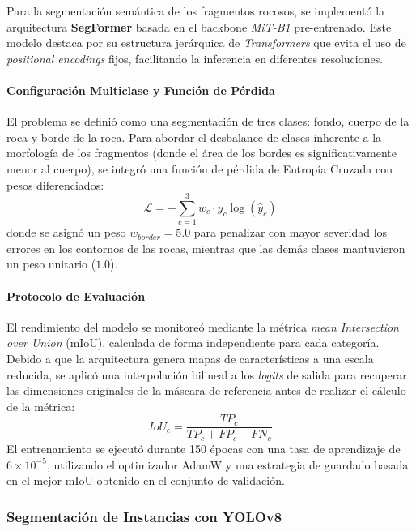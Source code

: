 Para la segmentación semántica de los fragmentos rocosos, se implementó la arquitectura \textbf{SegFormer} basada en el backbone \textit{MiT-B1} pre-entrenado. Este modelo destaca por su estructura jerárquica de \textit{Transformers} que evita el uso de \textit{positional encodings} fijos, facilitando la inferencia en diferentes resoluciones.

\paragraph{Configuración Multiclase y Función de Pérdida}
El problema se definió como una segmentación de tres clases: fondo, cuerpo de la roca y borde de la roca. Para abordar el desbalance de clases inherente a la morfología de los fragmentos (donde el área de los bordes es significativamente menor al cuerpo), se integró una función de pérdida de Entropía Cruzada con pesos diferenciados:
\begin{equation}
	\mathcal{L} = -\sum_{c=1}^{3} w_c \cdot y_c \log(\hat{y}_c)
\end{equation}
donde se asignó un peso $w_{border} = 5.0$ para penalizar con mayor severidad los errores en los contornos de las rocas, mientras que las demás clases mantuvieron un peso unitario ($1.0$).

\paragraph{Protocolo de Evaluación}
El rendimiento del modelo se monitoreó mediante la métrica \textit{mean Intersection over Union} (mIoU), calculada de forma independiente para cada categoría. Debido a que la arquitectura genera mapas de características a una escala reducida, se aplicó una interpolación bilineal a los \textit{logits} de salida para recuperar las dimensiones originales de la máscara de referencia antes de realizar el cálculo de la métrica:
\begin{equation}
	IoU_c = \frac{TP_c}{TP_c + FP_c + FN_c}
\end{equation}
El entrenamiento se ejecutó durante 150 épocas con una tasa de aprendizaje de $6 \times 10^{-5}$, utilizando el optimizador AdamW y una estrategia de guardado basada en el mejor mIoU obtenido en el conjunto de validación.

\subsubsection{Segmentación de Instancias con YOLOv8}

